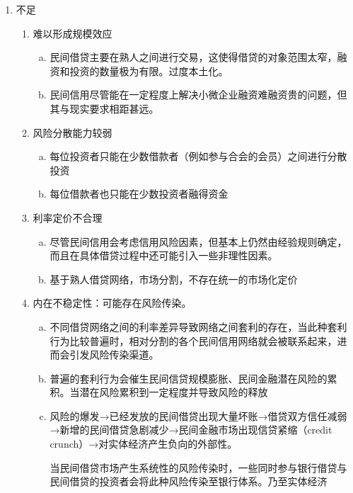 \documentclass[12pt]{book}
\begin{document}
\begin{enumerate}[1.]
    \item 不足
          \begin{enumerate}[(1)]
              \item 难以形成规模效应
                    \begin{enumerate}[a.]
                        \item 民间借贷主要在熟人之间进行交易，这使得借贷的对象范围太窄，融资和投资的数量极为有限。过度本土化。
                        \item 民间信用尽管能在一定程度上解决小微企业融资难融资贵的问题，但其与现实要求相距甚远。
                    \end{enumerate}
              \item 风险分散能力较弱
                    \begin{enumerate}[a.]
                        \item 每位投资者只能在少数借款者（例如参与合会的会员）之间进行分散投资
                        \item 每位借款者也只能在少数投资者融得资金
                    \end{enumerate}
              \item 利率定价不合理
                    \begin{enumerate}[a.]
                        \item 尽管民间信用会考虑信用风险因素，但基本上仍然由经验规则确定，而且在具体借贷过程中还可能引入一些非理性因素。
                        \item 基于熟人借贷网络，市场分割，不存在统一的市场化定价
                    \end{enumerate}
              \item 内在不稳定性：可能存在风险传染。
                    \begin{enumerate}[a.]
                        \item 不同借贷网络之间的利率差异导致网络之间套利的存在，当此种套利行为比较普遍时，相对分割的各个民间信用网络就会被联系起来，进而会引发风险传染渠道。
                        \item 普遍的套利行为会催生民间信贷规模膨胀、民间金融潜在风险的累积。当潜在风险累积到一定程度并导致风险的释放
                        \item 风险的爆发→已经发放的民间借贷出现大量坏账→借贷双方信任减弱→新增的民间借贷急剧减少→民间金融市场出现信贷紧缩（credit crunch）→对实体经济产生负向的外部性。
                              \par 当民间借贷市场产生系统性的风险传染时，一些同时参与银行借贷与民间借贷的投资者会将此种风险传染至银行体系。乃至实体经济
                    \end{enumerate}
          \end{enumerate}
\end{enumerate}
\end{document}
